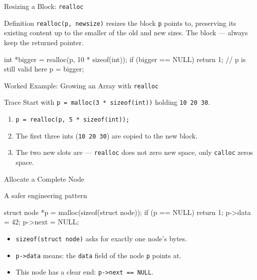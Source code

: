 \documentclass[aspectratio=169]{beamer}
\begin{document}
\begin{frame}[fragile]{Resizing a Block: \texttt{realloc}}
  \begin{block}{Definition}
    \texttt{realloc(p, newsize)} resizes the block \texttt{p} points to,
    preserving its existing content up to the smaller of the old and new
    sizes. The block  --- always keep the returned pointer.
  \end{block}
\begin{semiverbatim}
int *bigger = realloc(p, 10 * sizeof(int));
if (bigger == NULL) return 1;  \textcolor{neutral}{// p is still valid here}
p = bigger;
\end{semiverbatim}
\end{frame}

\begin{frame}{Worked Example: Growing an Array with \texttt{realloc}}
  \begin{block}{Trace}
    Start with \texttt{p = malloc(3 * sizeof(int))} holding \texttt{10 20 30}.
  \end{block}
  \begin{enumerate}
    \item \texttt{p = realloc(p, 5 * sizeof(int));}
    \item The first three ints (\texttt{10 20 30}) are copied to the new block.
    \item The two new slots are  --- \texttt{realloc} does
      not zero new space, only \texttt{calloc} zeros space.
  \end{enumerate}
\end{frame}

\begin{frame}[fragile]{Allocate a Complete Node}
  \begin{block}{A safer engineering pattern}
\begin{semiverbatim}
struct node *p = malloc(sizeof(struct node));
if (p == NULL) return 1;
p->data = 42;
p->next = NULL;
\end{semiverbatim}
  \end{block}
  \begin{itemize}
    \item \texttt{sizeof(struct node)} asks for exactly one node's bytes.
    \item \texttt{p->data} means: the \texttt{data} field of the node \texttt{p}
      points at.
    \item This node has a clear end: \texttt{p->next == NULL}.
  \end{itemize}
\end{frame}
\end{document}
